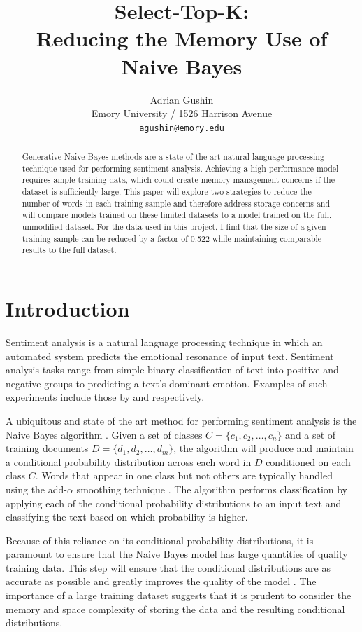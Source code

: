 \documentclass[11pt]{article}
\title{Select-Top-K: \\ Reducing the Memory Use of Naive Bayes}
\author{Adrian Gushin \\
  Emory University / 1526 Harrison Avenue \\
  \texttt{agushin@emory.edu}}
\begin{document}
{\makeatletter\acl@finalcopytrue
  \maketitle
}
\begin{abstract}
Generative Naive Bayes methods are a state of the art natural language processing technique used for performing sentiment analysis. Achieving a high-performance model requires ample training data, which could create memory management concerns if the dataset is sufficiently large. This paper will explore two strategies to reduce the number of words in each training sample and therefore address storage concerns and will compare models trained on these limited datasets to a model trained on the full, unmodified dataset. For the data used in this project, I find that the size of a given training sample can be reduced by a factor of 0.522 while maintaining comparable results to the full dataset.
\end{abstract}

\section{Introduction}

Sentiment analysis is a natural language processing technique in which an automated system predicts the emotional resonance of input text. Sentiment analysis tasks range from simple binary classification of text into positive and negative groups to predicting a text's dominant emotion. Examples of such experiments include those by \citet{go2009twitter} and \citet{saravia2018carer} respectively. 

A ubiquitous and state of the art method for performing sentiment analysis is the Naive Bayes algorithm \citep{khurana2023natural}. Given a set of classes $C = \{c_1, c_2,\dots,c_n\}$ and a set of training documents $D = \{d_1, d_2,\dots,d_m\}$, the algorithm will produce and maintain a conditional probability distribution across each word in $D$ conditioned on each class $C$. Words that appear in one class but not others are typically handled using the add-$\alpha$ smoothing technique \citep{cherian2017heart}. The algorithm performs classification by applying each of the conditional probability distributions to an input text and classifying the text based on which probability is higher.

Because of this reliance on its conditional probability distributions, it is paramount to ensure that the Naive Bayes model has large quantities of quality training data. This step will ensure that the conditional distributions are as accurate as possible and greatly improves the quality of the model \citep{islam2007investigating}. The importance of a large training dataset suggests that it is prudent to consider the memory and space complexity of storing the data and the resulting conditional distributions.
\end{document}
